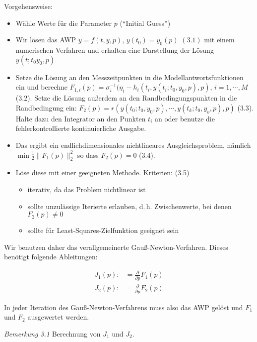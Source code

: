 


Vorgehensweise:
\begin{itemize}
\item Wähle Werte für die Parameter $p$ ("`Initial Guess"')
\item Wir lösen das AWP $\dot y = f(t,y,p)$, $y(t_0) = y_0(p)$ $(3.1)$ mit einem numerischen Verfahren und erhalten eine Darstellung der Lösung $y(t; t_0 y_0, p)$
\item Setze die Lösung an den Messzeitpunkten in die Modellantwortsfunktionen ein und berechne $F_{1,i}(p) = \sigma_i^{-1}(\eta_i - h_i(t_i, y(t_i; t_0, y_0, p), p)$, $i=1,\cdots,M$ (3.2). Setze die Lösung außerdem an den Randbedingungspunkten in die Randbedingung ein: $F_2(p) = r(y(t_0; t_0, y_0, p), \cdots, y(t_k; t_0, y_o, p), p)$ (3.3). Halte dazu den Integrator an den Punkten $t_i$ an oder benutze die fehlerkontrollierte kontinuierliche Ausgabe.
\item Das ergibt ein endlichdimensionales nichtlineares Ausgleichsproblem, nämlich $\min \tfrac 12 \|F_1(p)\|_2^2$ so dass $F_2(p) = 0$ (3.4).
\item Löse diese mit einer geeigneten Methode. Kriterien: (3.5)
\begin{itemize}
\item iterativ, da das Problem nichtlinear ist
\item sollte unzulässige Iterierte erlauben, d.\,h. Zwischenwerte, bei denen $F_2(p) \neq 0$
\item sollte für Least-Squares-Zielfunktion geeignet sein
\end{itemize}
\end{itemize}

Wir benutzen daher das verallgemeinerte Gauß-Newton-Verfahren. Dieses benötigt folgende Ableitungen:

\begin{align*}
J_1(p) \colon&= \frac \partial{\partial p} F_1(p) \\
J_2(p) \colon&= \frac \partial{\partial p} F_2(p)
\end{align*}

In jeder Iteration des Gauß-Newton-Verfahrens muss also das AWP gelöst und $F_1$ und $F_2$ ausgewertet werden.

\emph{Bemerkung 3.1} Berechnung von $J_1$ und $J_2$.


